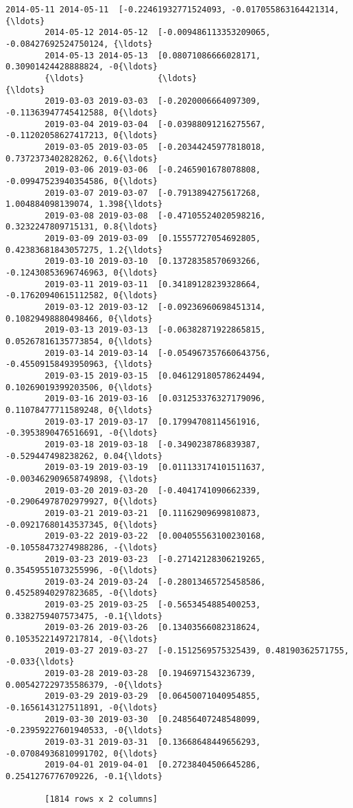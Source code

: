 \documentclass[11pt]{article}
\begin{document}
\begin{Verbatim}[commandchars=\\\{\}]
        2014-05-11 2014-05-11  [-0.22461932771524093, -0.017055863164421314, {\ldots}
        2014-05-12 2014-05-12  [-0.009486113353209065, -0.08427692524750124, {\ldots}
        2014-05-13 2014-05-13  [0.08071086666028171, 0.30901424428888824, -0{\ldots}
        {\ldots}               {\ldots}                                                {\ldots}
        2019-03-03 2019-03-03  [-0.2020006664097309, -0.11363947745412588, 0{\ldots}
        2019-03-04 2019-03-04  [-0.03988091216275567, -0.11202058627417213, 0{\ldots}
        2019-03-05 2019-03-05  [-0.20344245977818018, 0.7372373402828262, 0.6{\ldots}
        2019-03-06 2019-03-06  [-0.2465901678078808, -0.09947523940354586, 0{\ldots}
        2019-03-07 2019-03-07  [-0.7913894275617268, 1.004884098139074, 1.398{\ldots}
        2019-03-08 2019-03-08  [-0.47105524020598216, 0.3232247809715131, 0.8{\ldots}
        2019-03-09 2019-03-09  [0.15557727054692805, 0.42383681843057275, 1.2{\ldots}
        2019-03-10 2019-03-10  [0.13728358570693266, -0.12430853696746963, 0{\ldots}
        2019-03-11 2019-03-11  [0.34189128239328664, -0.17620940615112582, 0{\ldots}
        2019-03-12 2019-03-12  [-0.09236960698451314, 0.10829498880498466, 0{\ldots}
        2019-03-13 2019-03-13  [-0.06382871922865815, 0.05267816135773854, 0{\ldots}
        2019-03-14 2019-03-14  [-0.054967357660643756, -0.45509158493950963, {\ldots}
        2019-03-15 2019-03-15  [0.046129180578624494, 0.10269019399203506, 0{\ldots}
        2019-03-16 2019-03-16  [0.031253376327179096, 0.11078477711589248, 0{\ldots}
        2019-03-17 2019-03-17  [0.17994708114561916, -0.3953890476516691, -0{\ldots}
        2019-03-18 2019-03-18  [-0.3490238786839387, -0.529447498238262, 0.04{\ldots}
        2019-03-19 2019-03-19  [0.011133174101511637, -0.003462909658749898, {\ldots}
        2019-03-20 2019-03-20  [-0.4041741090662339, -0.29064978702979927, 0{\ldots}
        2019-03-21 2019-03-21  [0.11162909699810873, -0.09217680143537345, 0{\ldots}
        2019-03-22 2019-03-22  [0.004055563100230168, -0.10558473274988286, -{\ldots}
        2019-03-23 2019-03-23  [-0.27142128306219265, 0.35459551073255996, -0{\ldots}
        2019-03-24 2019-03-24  [-0.28013465725458586, 0.45258940297823685, -0{\ldots}
        2019-03-25 2019-03-25  [-0.5653454885400253, 0.3382759407573475, -0.1{\ldots}
        2019-03-26 2019-03-26  [0.13403566082318624, 0.10535221497217814, -0{\ldots}
        2019-03-27 2019-03-27  [-0.1512569575325439, 0.48190362571755, -0.033{\ldots}
        2019-03-28 2019-03-28  [0.1946971543236739, 0.005427229735586379, -0{\ldots}
        2019-03-29 2019-03-29  [0.06450071040954855, -0.1656143127511891, -0{\ldots}
        2019-03-30 2019-03-30  [0.24856407248548099, -0.23959227601940533, -0{\ldots}
        2019-03-31 2019-03-31  [0.13668648449656293, -0.07084936810991702, 0{\ldots}
        2019-04-01 2019-04-01  [0.27238404506645286, 0.2541276776709226, -0.1{\ldots}
        
        [1814 rows x 2 columns]
\end{Verbatim}
            
\end{document}
